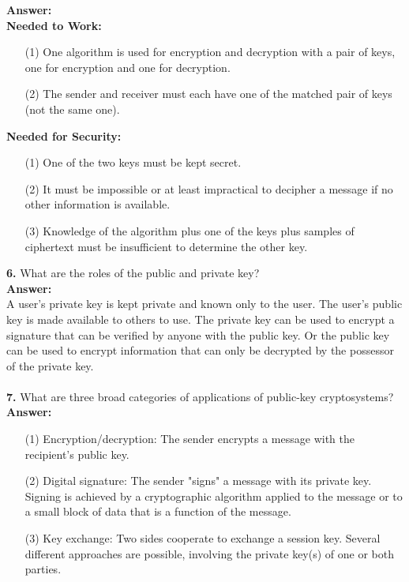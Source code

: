 \documentclass[paper=a4, fontsize=11pt]{scrartcl} %
\numberwithin{equation}{section} %
\numberwithin{figure}{section} %
\numberwithin{table}{section} %
\begin{document}
 \textbf{Answer:}\\

 \textbf{Needed to Work:}
 \begin{enumerate}
 \item[(1)] One algorithm is used for encryption and decryption with a pair of keys, one for encryption and one for decryption.
 \item[(2)] The sender and receiver must each have one of the matched pair of keys (not the same one).
 \end{enumerate}

 \textbf{Needed for Security:}
 \begin{enumerate}
 \item[(1)] One of the two keys must be kept secret.
 \item[(2)] It must be impossible or at least impractical to decipher a message if no other information is available.
 \item[(3)] Knowledge of the algorithm plus one of the keys plus samples of ciphertext must be insufficient to determine the other key.\\
 \end{enumerate}




 \textbf{6.} What are the roles of the public and private key?\\

 \textbf{Answer:}\\

  A user's private key is kept private and known only to the user. The user's public key is made available to others to use. The private key can be used to encrypt a signature that can be verified by anyone with the public key. Or the public key can be used to encrypt information that can only be decrypted by the possessor of the private key.\\ \\



 \textbf{7.} What are three broad categories of applications of public-key cryptosystems?\\

 \textbf{Answer:}

 \begin{enumerate}
 \item[(1)] Encryption/decryption: The sender encrypts a message with the recipient's public key.
 \item[(2)] Digital signature: The sender "signs" a message with its private key. Signing is achieved by a cryptographic algorithm applied to the message or to a small block of data that is a function of the message.
 \item[(3)] Key exchange: Two sides cooperate to exchange a session key. Several different approaches are possible, involving the private key(s) of one or both parties.\\
 \end{enumerate}
\end{document}
